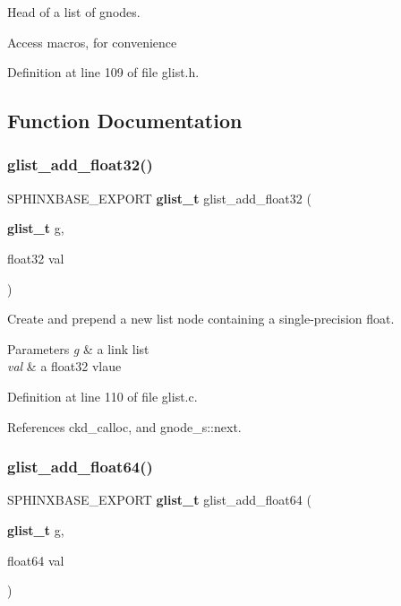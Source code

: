 Head of a list of gnodes. 

Access macros, for convenience 

Definition at line 109 of file glist.\+h.



\subsection{Function Documentation}
\mbox{\label{glist_8h_a4fc4db2fbebd7b659554227d411f6737}} 
\subsubsection{glist\+\_\+add\+\_\+float32()}
{\footnotesize\ttfamily S\+P\+H\+I\+N\+X\+B\+A\+S\+E\+\_\+\+E\+X\+P\+O\+RT \textbf{ glist\+\_\+t} glist\+\_\+add\+\_\+float32 (\begin{DoxyParamCaption}\item[{\textbf{ glist\+\_\+t}}]{g,  }\item[{float32}]{val }\end{DoxyParamCaption})}



Create and prepend a new list node containing a single-\/precision float. 


\begin{DoxyParams}{Parameters}
{\em g} & a link list \\
\hline
{\em val} & a float32 vlaue \\
\hline
\end{DoxyParams}


Definition at line 110 of file glist.\+c.



References ckd\+\_\+calloc, and gnode\+\_\+s\+::next.

\mbox{\label{glist_8h_a5bdd11639ef5846abb7ceb6caf059f4e}} 
\subsubsection{glist\+\_\+add\+\_\+float64()}
{\footnotesize\ttfamily S\+P\+H\+I\+N\+X\+B\+A\+S\+E\+\_\+\+E\+X\+P\+O\+RT \textbf{ glist\+\_\+t} glist\+\_\+add\+\_\+float64 (\begin{DoxyParamCaption}\item[{\textbf{ glist\+\_\+t}}]{g,  }\item[{float64}]{val }\end{DoxyParamCaption})}



